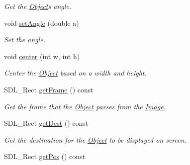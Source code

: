 \begin{DoxyCompactItemize}
\begin{DoxyCompactList}\small\item\em Get the \hyperlink{classObject}{Object}\textquotesingle{}s angle. \end{DoxyCompactList}\item 
void \hyperlink{classObject_a17b2cae6baa17a776d13243841d39c77}{set\+Angle} (double a)\hypertarget{classObject_a17b2cae6baa17a776d13243841d39c77}{}\label{classObject_a17b2cae6baa17a776d13243841d39c77}

\begin{DoxyCompactList}\small\item\em Set the angle. \end{DoxyCompactList}\item 
void \hyperlink{classObject_a95af63b61c22ac2a8117742b9fa0efb5}{center} (int w, int h)\hypertarget{classObject_a95af63b61c22ac2a8117742b9fa0efb5}{}\label{classObject_a95af63b61c22ac2a8117742b9fa0efb5}

\begin{DoxyCompactList}\small\item\em Center the \hyperlink{classObject}{Object} based on a width and height. \end{DoxyCompactList}\item 
S\+D\+L\+\_\+\+Rect \hyperlink{classObject_a8bebf403c97590d3333de2cd073670f9}{get\+Frame} () const \hypertarget{classObject_a8bebf403c97590d3333de2cd073670f9}{}\label{classObject_a8bebf403c97590d3333de2cd073670f9}

\begin{DoxyCompactList}\small\item\em Get the frame that the \hyperlink{classObject}{Object} parses from the \hyperlink{classImage}{Image}. \end{DoxyCompactList}\item 
S\+D\+L\+\_\+\+Rect \hyperlink{classObject_acecef2e384a8f507f533f18dcd376d05}{get\+Dest} () const \hypertarget{classObject_acecef2e384a8f507f533f18dcd376d05}{}\label{classObject_acecef2e384a8f507f533f18dcd376d05}

\begin{DoxyCompactList}\small\item\em Get the destination for the \hyperlink{classObject}{Object} to be displayed on screen. \end{DoxyCompactList}\item 
S\+D\+L\+\_\+\+Rect \hyperlink{classObject_a53675f3a562b20883cae4ffba4166478}{get\+Pos} () const \hypertarget{classObject_a53675f3a562b20883cae4ffba4166478}{}\label{classObject_a53675f3a562b20883cae4ffba4166478}


\end{DoxyCompactItemize}
